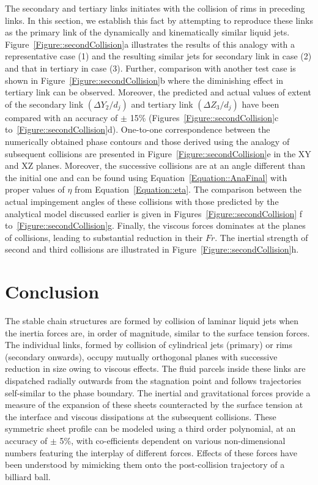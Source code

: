 \documentclass{jfm}
\begin{document}
The secondary and tertiary links initiates with the collision of rims in preceding links. In this section, we establish this fact by attempting to reproduce these links as the primary link of the dynamically and kinematically similar liquid jets. Figure~\ref{Figure::secondCollision}a illustrates the results of this analogy with a representative case (1) and the resulting similar jets for secondary link in case (2) and that in tertiary in case (3). Further, comparison with another test case is shown in Figure~\ref{Figure::secondCollision}b where the diminishing effect in tertiary link can be observed. Moreover, the predicted and actual values of extent of the secondary link $\left(\Delta Y_2/d_j\right)$ and tertiary link $\left(\Delta Z_3/d_j\right)$ have been compared with an accuracy of $\pm$ 15\% (Figures~\ref{Figure::secondCollision}c to~\ref{Figure::secondCollision}d). One-to-one correspondence between the numerically obtained phase contours and those derived using the analogy of subsequent collisions are presented in Figure~\ref{Figure::secondCollision}e in the XY and XZ planes. Moreover, the successive collisions are at an angle different than the initial one and can be found using Equation~\ref{Equation::AnaFinal} with proper values of $\eta$ from Equation~\ref{Equation::eta}. The comparison between the actual impingement angles of these collisions with those predicted by the analytical model discussed earlier is given in Figures~\ref{Figure::secondCollision}  f to~\ref{Figure::secondCollision}g. Finally, the viscous forces dominates at the planes of collisions, leading to substantial reduction in their $Fr$. The inertial strength of second and third collisions are illustrated in Figure~\ref{Figure::secondCollision}h. 
\section{Conclusion}
The stable chain structures are formed by collision of laminar liquid jets when the inertia forces are, in order of magnitude, similar to the surface tension forces. The individual links, formed by collision of cylindrical jets (primary) or rims (secondary onwards), occupy mutually orthogonal planes with successive reduction in size owing to viscous effects. The fluid parcels inside these links are dispatched radially outwards from the stagnation point and follows trajectories self-similar to the phase boundary. The inertial and gravitational forces provide a measure of the expansion of these sheets counteracted by the surface tension at the interface and viscous dissipations at the subsequent collisions. These symmetric sheet profile can be modeled using a third order polynomial, at an accuracy of $\pm$ 5\%, with co-efficients dependent on various non-dimensional numbers featuring the interplay of different forces. Effects of these forces have been understood by mimicking them onto the post-collision trajectory of a billiard ball.   



\end{document}
